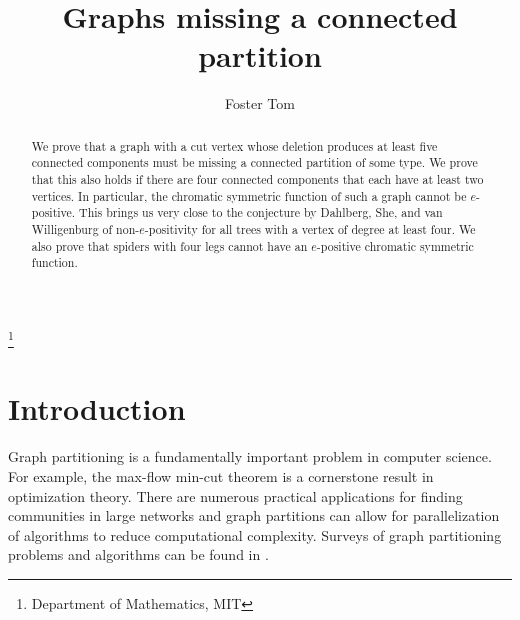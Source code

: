 \documentclass[12pt]{amsart}  %
\theoremstyle{definition}
\theoremstyle{remark}
\numberwithin{equation}{section}
\begin{document}
\title{Graphs missing a connected partition}

\author{Foster Tom}
\thanks{Department of Mathematics, MIT}

\begin{abstract}
We prove that a graph with a cut vertex whose deletion produces at least five connected components must be missing a connected partition of some type. We prove that this also holds if there are four connected components that each have at least two vertices. In particular, the chromatic symmetric function of such a graph cannot be $e$-positive. This brings us very close to the conjecture by Dahlberg, She, and van Willigenburg of non-$e$-positivity for all trees with a vertex of degree at least four. We also prove that spiders with four legs cannot have an $e$-positive chromatic symmetric function.
\end{abstract}




\maketitle
\vspace{30pt}
\section{Introduction}\label{section:introduction}

Graph partitioning is a fundamentally important problem in computer science. For example, the max-flow min-cut theorem \cite{maxflowmincut} is a cornerstone result in optimization theory. There are numerous practical applications for finding communities in large networks and graph partitions can allow for parallelization of algorithms to reduce computational complexity. Surveys of graph partitioning problems and algorithms can be found in \cite{graphparalg, graphparadv, graphparmeth, graphclustering}.
\end{document}
